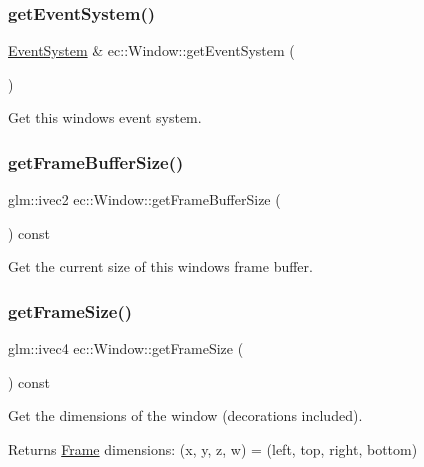 \subsubsection{\texorpdfstring{get\+Event\+System()}{getEventSystem()}}
{\footnotesize\ttfamily \mbox{\hyperlink{classec_1_1_event_system}{Event\+System}} \& ec\+::\+Window\+::get\+Event\+System (\begin{DoxyParamCaption}{ }\end{DoxyParamCaption})}

Get this window\textquotesingle{}s event system. \mbox{\label{classec_1_1_window_a855a303eca483fc69ad278df77f1de4c}} 
\subsubsection{\texorpdfstring{get\+Frame\+Buffer\+Size()}{getFrameBufferSize()}}
{\footnotesize\ttfamily glm\+::ivec2 ec\+::\+Window\+::get\+Frame\+Buffer\+Size (\begin{DoxyParamCaption}{ }\end{DoxyParamCaption}) const}

Get the current size of this window\textquotesingle{}s frame buffer. \mbox{\label{classec_1_1_window_ab97322933ab8306533a1ab9b3e2fb57d}} 
\subsubsection{\texorpdfstring{get\+Frame\+Size()}{getFrameSize()}}
{\footnotesize\ttfamily glm\+::ivec4 ec\+::\+Window\+::get\+Frame\+Size (\begin{DoxyParamCaption}{ }\end{DoxyParamCaption}) const}

Get the dimensions of the window (decorations included). \begin{DoxyReturn}{Returns}
\mbox{\hyperlink{classec_1_1_frame}{Frame}} dimensions\+: (x, y, z, w) = (left, top, right, bottom) 
\end{DoxyReturn}
\mbox{\label{classec_1_1_window_a16e7202f6f304e998772d58a9207bdee}} 
